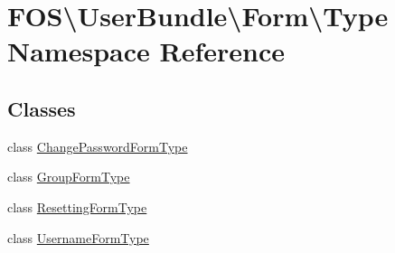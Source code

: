 \hypertarget{namespace_f_o_s_1_1_user_bundle_1_1_form_1_1_type}{\section{F\+O\+S\textbackslash{}User\+Bundle\textbackslash{}Form\textbackslash{}Type Namespace Reference}
\label{namespace_f_o_s_1_1_user_bundle_1_1_form_1_1_type}
}
\subsection*{Classes}
\begin{DoxyCompactItemize}
\item 
class \hyperlink{class_f_o_s_1_1_user_bundle_1_1_form_1_1_type_1_1_change_password_form_type}{Change\+Password\+Form\+Type}
\item 
class \hyperlink{class_f_o_s_1_1_user_bundle_1_1_form_1_1_type_1_1_group_form_type}{Group\+Form\+Type}
\item 
class \hyperlink{class_f_o_s_1_1_user_bundle_1_1_form_1_1_type_1_1_resetting_form_type}{Resetting\+Form\+Type}
\item 
class \hyperlink{class_f_o_s_1_1_user_bundle_1_1_form_1_1_type_1_1_username_form_type}{Username\+Form\+Type}
\end{DoxyCompactItemize}
